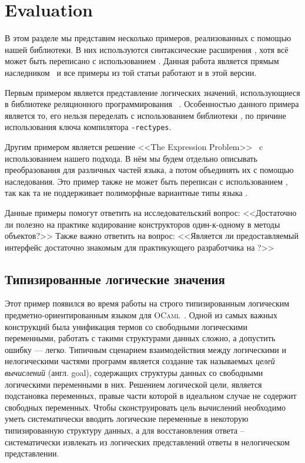 \section{Evaluation}
\label{sec:Evaluation	}

В этом разделе мы представим несколько примеров, реализованных с помощью нашей библиотеки. В них используются синтаксические расширения \camlpfive{}, хотя всё может быть переписано с использованием \PPX{}. Данная работа является прямым наследником~\cite{SCICO} и все примеры из той статьи работают и в этой версии. 

Первым примером является представление логических значений, использующиеся в  библиотеке реляционного программирования \OCanren{}~\cite{OCanren}. Особенностью данного примера является то, его нельзя переделать с использованием библиотеки \visitors{}, по причине использования ключа компилятора \texttt{-rectypes}.

Другим примером является решение <<The Expression Problem>>~\cite{ExpressionProblem} c использованием нашего подхода. В нём мы будем отдельно описывать преобразования для различных частей языка, а потом объединять их с помощью наследования. Это пример также не может быть переписан с использованием \visitors{}, так как та не поддерживает полиморфные вариантные типы языка \ocaml{}.

Данные примеры помогут ответить на исследовательский вопрос: <<Достаточно ли полезно на практике кодирование конструкторов один-к-одному в методы объектов?>> Также важно ответить на вопрос: <<Является ли предоставляемый интерфейс достаточно знакомым для практикующего разработчика на \ocaml{}?>>

\subsection{Типизированные логические значения}
\label{sec:lists}

Этот пример появился во время работы на строго типизированным логическим предметно-ориентированным языком для \textsc{OCaml}~\cite{OCanren}. 
Одной из самых важных конструкций была унификация термов со свободными логическими переменными, работать с такими структурами данных сложно, а допустить ошибку --- легко. Типичным сценарием взаимодействия  между логическими и нелогическими частями программ является 
создание так называемых \emph{целей вычислений} (англ. goal), содержащих структуры данных со свободными логическими переменными в них.
Решением логической цели, является подстановка переменных, правые части которой в идеальном случае не содержит свободных переменных. 
Чтобы сконструировать цель вычислений необходимо уметь систематически вводить логические переменные в некоторую типизированную структуру данных,  а для восстановления ответа -- систематически извлекать из логических представлений ответы в нелогическом представлении.

